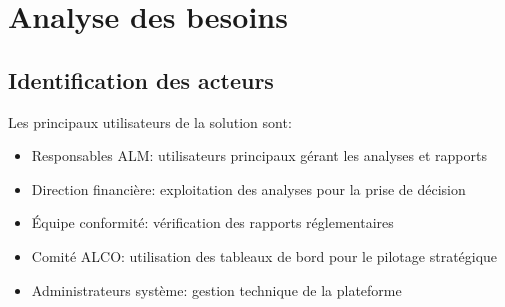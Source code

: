 \documentclass[12pt,a4paper]{report}
\begin{document}
\section{Analyse des besoins}

\subsection{Identification des acteurs}
Les principaux utilisateurs de la solution sont:
\begin{itemize}
    \item Responsables ALM: utilisateurs principaux gérant les analyses et rapports
    \item Direction financière: exploitation des analyses pour la prise de décision
    \item Équipe conformité: vérification des rapports réglementaires
    \item Comité ALCO: utilisation des tableaux de bord pour le pilotage stratégique
    \item Administrateurs système: gestion technique de la plateforme
\end{itemize}
\end{document}
